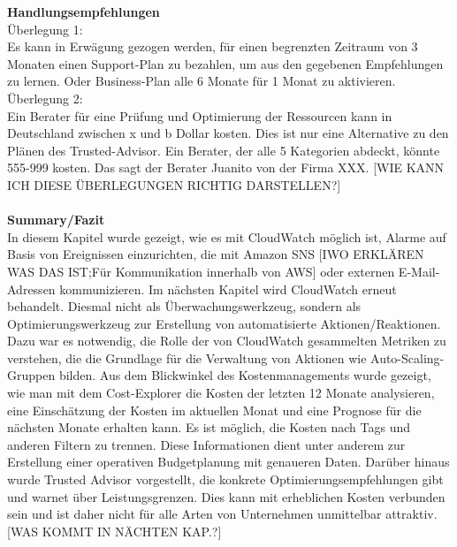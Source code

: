 \textbf{Handlungsempfehlungen} \\
Überlegung 1: \\
Es kann in Erwägung gezogen werden, für einen begrenzten Zeitraum von 3 Monaten einen Support-Plan zu bezahlen, um aus den gegebenen Empfehlungen zu lernen. Oder Business-Plan alle 6 Monate für 1 Monat zu aktivieren.  
\\
Überlegung 2: \\ 
Ein Berater für eine Prüfung und Optimierung der Ressourcen kann in Deutschland zwischen x und b Dollar kosten. Dies ist nur eine Alternative zu den Plänen des Trusted-Advisor. Ein Berater, der alle 5 Kategorien abdeckt, könnte 555-999 kosten. Das sagt der Berater Juanito von der Firma XXX.
[WIE KANN ICH DIESE ÜBERLEGUNGEN RICHTIG DARSTELLEN?]
\\\\
\textbf{Summary/Fazit}\\
In diesem Kapitel wurde gezeigt, wie es mit CloudWatch möglich ist, Alarme auf Basis von Ereignissen einzurichten, die mit Amazon SNS [IWO ERKLÄREN WAS DAS IST;Für Kommunikation innerhalb von AWS] oder externen E-Mail-Adressen kommunizieren. Im nächsten Kapitel wird CloudWatch erneut behandelt. Diesmal nicht als Überwachungswerkzeug, sondern als Optimierungswerkzeug zur Erstellung von automatisierte Aktionen/Reaktionen. Dazu war es notwendig, die Rolle der von CloudWatch gesammelten Metriken zu verstehen, die die Grundlage für die Verwaltung von Aktionen wie Auto-Scaling-Gruppen bilden. 
Aus dem Blickwinkel des Kostenmanagements wurde gezeigt, wie man mit dem Cost-Explorer die Kosten der letzten 12 Monate analysieren, eine Einschätzung der Kosten im aktuellen Monat und eine Prognose für die nächsten Monate erhalten kann. Es ist möglich, die Kosten nach Tags und anderen Filtern zu trennen. Diese Informationen dient unter anderem zur Erstellung einer operativen Budgetplanung mit genaueren Daten.
Darüber hinaus wurde Trusted Advisor vorgestellt, die konkrete Optimierungsempfehlungen gibt und warnet über Leistungsgrenzen. Dies kann mit erheblichen Kosten verbunden sein und ist daher nicht für alle Arten von Unternehmen unmittelbar attraktiv. 
[WAS KOMMT IN NÄCHTEN KAP.?]

